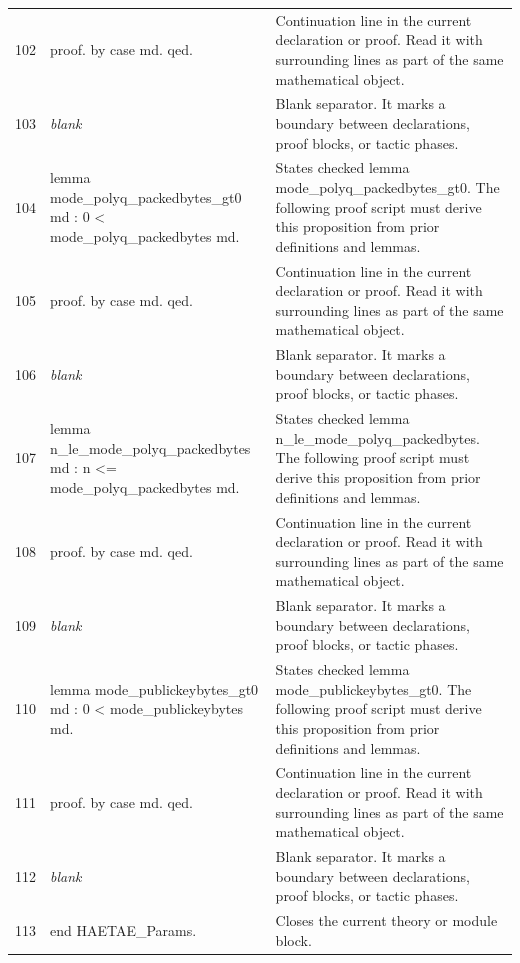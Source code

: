 \documentclass[10pt]{article}
\begin{document}
\begin{longtable}{r L{0.53\textwidth} L{0.37\textwidth}}
102 & {\ttfamily\scriptsize proof. by case md. qed.} & Continuation line in the current declaration or proof.  Read it with surrounding lines as part of the same mathematical object. \\
103 & {\ttfamily\scriptsize \emph{blank}} & Blank separator.  It marks a boundary between declarations, proof blocks, or tactic phases. \\
104 & {\ttfamily\scriptsize lemma mode\_polyq\_packedbytes\_gt0 md : 0 < mode\_polyq\_packedbytes md.} & States checked lemma mode\_polyq\_packedbytes\_gt0.  The following proof script must derive this proposition from prior definitions and lemmas. \\
105 & {\ttfamily\scriptsize proof. by case md. qed.} & Continuation line in the current declaration or proof.  Read it with surrounding lines as part of the same mathematical object. \\
106 & {\ttfamily\scriptsize \emph{blank}} & Blank separator.  It marks a boundary between declarations, proof blocks, or tactic phases. \\
107 & {\ttfamily\scriptsize lemma n\_le\_mode\_polyq\_packedbytes md : n <= mode\_polyq\_packedbytes md.} & States checked lemma n\_le\_mode\_polyq\_packedbytes.  The following proof script must derive this proposition from prior definitions and lemmas. \\
108 & {\ttfamily\scriptsize proof. by case md. qed.} & Continuation line in the current declaration or proof.  Read it with surrounding lines as part of the same mathematical object. \\
109 & {\ttfamily\scriptsize \emph{blank}} & Blank separator.  It marks a boundary between declarations, proof blocks, or tactic phases. \\
110 & {\ttfamily\scriptsize lemma mode\_publickeybytes\_gt0 md : 0 < mode\_publickeybytes md.} & States checked lemma mode\_publickeybytes\_gt0.  The following proof script must derive this proposition from prior definitions and lemmas. \\
111 & {\ttfamily\scriptsize proof. by case md. qed.} & Continuation line in the current declaration or proof.  Read it with surrounding lines as part of the same mathematical object. \\
112 & {\ttfamily\scriptsize \emph{blank}} & Blank separator.  It marks a boundary between declarations, proof blocks, or tactic phases. \\
113 & {\ttfamily\scriptsize end HAETAE\_Params.} & Closes the current theory or module block. \\
\bottomrule
\end{longtable}
\end{document}
